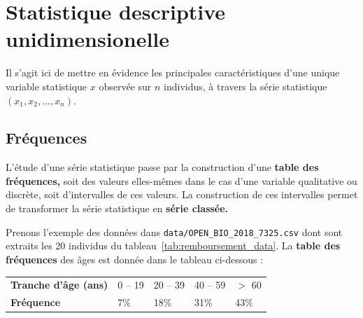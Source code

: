 \section{Statistique descriptive unidimensionelle}
Il s'agit ici de mettre en évidence les principales caractéristiques d'une
unique variable statistique $x$ observée sur $n$ individus, à travers la série
statistique $(x_1, x_2, \dots, x_n).$

\subsection{Fréquences}
L'étude d'une série statistique passe par la construction d'une \textbf{table
	des fréquences,} soit des valeurs elles-mêmes dans le cas d'une variable
qualitative ou discrète, soit d'intervalles de ces valeurs. La construction de
ces intervalles permet de transformer la série statistique en \textbf{série
	classée.}
\pagebreak

\begin{exemple}
	Prenons l'exemple des données dans
	\texttt{data/OPEN\_BIO\_2018\_7325.csv} dont sont extraits les 20 individus
	du tableau~\ref{tab:remboursement_data}. La \textbf{table des fréquences}
	des âges est donnée dans le tableau ci-dessous : %
		\vspace*{-.25em}
		\begin{table}[H]\captionsetup{labelformat=empty} 
			\centering
			\begin{tabular}{lb{1.5cm}b{1.5cm}b{1.5cm}b{1.5cm}} \toprule[1.5pt] 
				\textbf{Tranche d'âge (ans)}   & 0 -- 19 & 20 -- 39  & 40 -- 59  & $>$ 60    \\
				\textbf{Fréquence}             & 7\%     & 18\%      & 31\%      & 43\%      \\
				\bottomrule[1.5pt]
			\end{tabular}
		\end{table}
		\vspace*{-1em}
\end{exemple}

